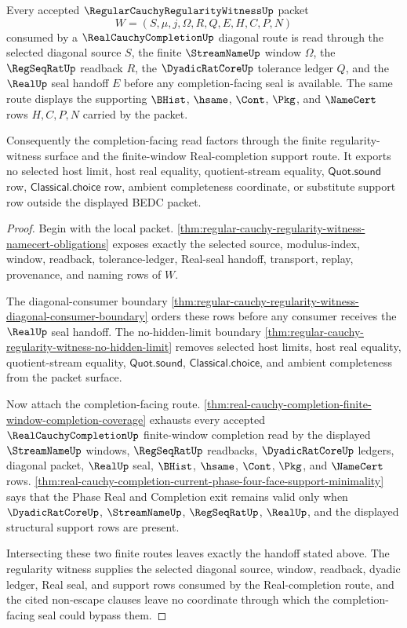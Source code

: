 \begin{theorem}
\label{thm:regular-cauchy-regularity-witness-real-completion-handoff}
Every accepted $\RegularCauchyRegularityWitnessUp$ packet
$$
W=(S,\mu,j,\Omega,R,Q,E,H,C,P,N)
$$
consumed by a $\RealCauchyCompletionUp$ diagonal route is read through the selected diagonal source $S$, the finite $\StreamNameUp$ window $\Omega$, the $\RegSeqRatUp$ readback $R$, the $\DyadicRatCoreUp$ tolerance ledger $Q$, and the $\RealUp$ seal handoff $E$ before any completion-facing seal is available. The same route displays the supporting $\BHist$, $\hsame$, $\Cont$, $\Pkg$, and $\NameCert$ rows $H,C,P,N$ carried by the packet.

Consequently the completion-facing read factors through the finite regularity-witness surface and the finite-window Real-completion support route. It exports no selected host limit, host real equality, quotient-stream equality, $\mathsf{Quot.sound}$ row, $\mathsf{Classical.choice}$ row, ambient completeness coordinate, or substitute support row outside the displayed BEDC packet.
\end{theorem}
\begin{proof}
Begin with the local packet. \autoref{thm:regular-cauchy-regularity-witness-namecert-obligations} exposes exactly the selected source, modulus-index, window, readback, tolerance-ledger, Real-seal handoff, transport, replay, provenance, and naming rows of $W$.

The diagonal-consumer boundary \autoref{thm:regular-cauchy-regularity-witness-diagonal-consumer-boundary} orders these rows before any consumer receives the $\RealUp$ seal handoff. The no-hidden-limit boundary \autoref{thm:regular-cauchy-regularity-witness-no-hidden-limit} removes selected host limits, host real equality, quotient-stream equality, $\mathsf{Quot.sound}$, $\mathsf{Classical.choice}$, and ambient completeness from the packet surface.

Now attach the completion-facing route. \autoref{thm:real-cauchy-completion-finite-window-completion-coverage} exhausts every accepted $\RealCauchyCompletionUp$ finite-window completion read by the displayed $\StreamNameUp$ windows, $\RegSeqRatUp$ readbacks, $\DyadicRatCoreUp$ ledgers, diagonal packet, $\RealUp$ seal, $\BHist$, $\hsame$, $\Cont$, $\Pkg$, and $\NameCert$ rows. \autoref{thm:real-cauchy-completion-current-phase-four-face-support-minimality} says that the Phase Real and Completion exit remains valid only when $\DyadicRatCoreUp$, $\StreamNameUp$, $\RegSeqRatUp$, $\RealUp$, and the displayed structural support rows are present.

Intersecting these two finite routes leaves exactly the handoff stated above. The regularity witness supplies the selected diagonal source, window, readback, dyadic ledger, Real seal, and support rows consumed by the Real-completion route, and the cited non-escape clauses leave no coordinate through which the completion-facing seal could bypass them.
\end{proof}

